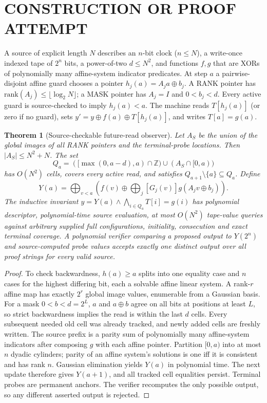 \documentclass[11pt]{article}
\newtheorem{theorem}{Theorem}
\begin{document}
\section{CONSTRUCTION OR PROOF ATTEMPT}
A source of explicit length $N$ describes an $n$-bit clock ($n\le N$), a write-once indexed tape of $2^n$ bits, a power-of-two $d\le N^2$, and functions $f,g$ that are XORs of polynomially many affine-system indicator predicates. At step $a$ a pairwise-disjoint affine guard chooses a pointer $h_j(a)=A_ja\oplus b_j$. A \textsf{RANK} pointer has $\mathrm{rank}(A_j)\le\lfloor\log_2N\rfloor$; a \textsf{MASK} pointer has $A_j=I$ and $0<b_j<d$. Every active guard is source-checked to imply $h_j(a)<a$. The machine reads $T[h_j(a)]$ (or zero if no guard), sets $y'=y\oplus f(a)\oplus T[h_j(a)]$, and writes $T[a]=g(a)$.
\begin{theorem}[Source-checkable future-read observer]
Let $A_S$ be the union of the global images of all \textsf{RANK} pointers and the terminal-probe locations. Then $|A_S|\le N^2+N$. The set
\[Q_a=([\max(0,a-d),a)\cap\mathbb Z)\cup(A_S\cap[0,a))\]
has $O(N^2)$ cells, covers every active read, and satisfies $Q_{a+1}\setminus\{a\}\subseteq Q_a$. Define
\[Y(a)=\bigoplus_{v<a}\left(f(v)\oplus\bigoplus_j[G_j(v)]g(A_jv\oplus b_j)\right).\]
The inductive invariant $y=Y(a)\wedge\bigwedge_{i\in Q_a}T[i]=g(i)$ has polynomial descriptor, polynomial-time source evaluation, at most $O(N^2)$ tape-value queries against arbitrary supplied full configurations, initiality, consecution and exact terminal coverage. A polynomial verifier comparing a proposed output to $Y(2^n)$ and source-computed probe values accepts exactly one distinct output over \emph{all} proof strings for every valid source.
\end{theorem}
\begin{proof}
To check backwardness, $h(a)\ge a$ splits into one equality case and $n$ cases for the highest differing bit, each a solvable affine linear system. A rank-$r$ affine map has exactly $2^r$ global image values, enumerable from a Gaussian basis. For a mask $0<b<d=2^L$, $a$ and $a\oplus b$ agree on all bits at positions at least $L$, so strict backwardness implies the read is within the last $d$ cells. Every subsequent needed old cell was already tracked, and newly added cells are freshly written. The source prefix is a parity sum of polynomially many affine-system indicators after composing $g$ with each affine pointer. Partition $[0,a)$ into at most $n$ dyadic cylinders; parity of an affine system's solutions is one iff it is consistent and has rank $n$. Gaussian elimination yields $Y(a)$ in polynomial time. The next update therefore gives $Y(a+1)$, and all tracked cell equalities persist. Terminal probes are permanent anchors. The verifier recomputes the only possible output, so any different asserted output is rejected.
\end{proof}
\end{document}
